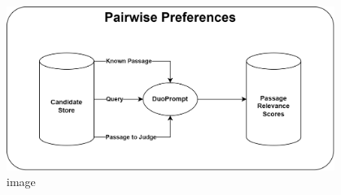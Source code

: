 \begin{figure}[ht]
    \centering
    \includegraphics[width=0.95\textwidth]{./graphics/drawio/pairwise_preferences.png}
    \caption{image}
    \label{fig:pairwise-preferences}
\end{figure}

